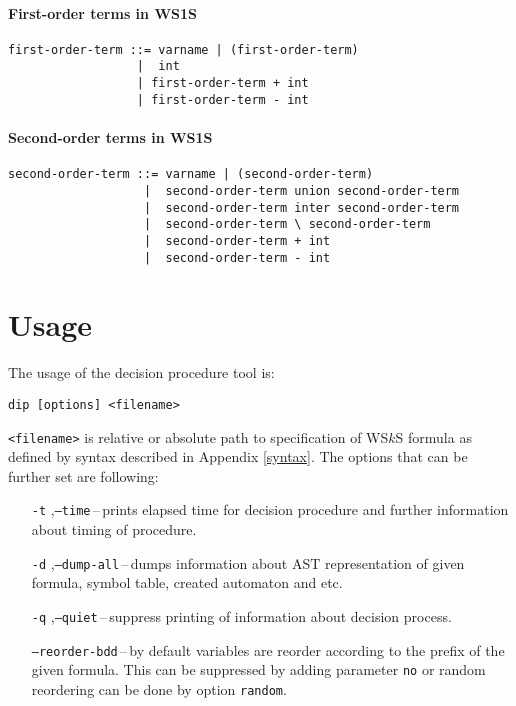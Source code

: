 \subsubsection{First-order terms in WS1S}
\begin{verbatim}
first-order-term ::= varname | (first-order-term)
                  |  int
                  | first-order-term + int
                  | first-order-term - int
\end{verbatim}

\subsubsection{Second-order terms in WS1S}
\begin{verbatim}
second-order-term ::= varname | (second-order-term)
                   |  second-order-term union second-order-term
                   |  second-order-term inter second-order-term
                   |  second-order-term \ second-order-term
                   |  second-order-term + int
                   |  second-order-term - int
\end{verbatim}

\chapter{Usage}
The usage of the decision procedure tool is:
\begin{center}
 \texttt{dip [options] <filename>}
\end{center}
\texttt{<filename>} is relative or absolute path to specification of WS$k$S
formula as defined by syntax described in Appendix \ref{syntax}. The options
that can be further set are following:
\begin{itemize}
  \item[\texttt{-t}],\texttt{--time}\,--\,prints elapsed time for decision
  procedure and further information about timing of procedure.
  \item[\texttt{-d}],\texttt{--dump-all}\,--\,dumps information about AST
  representation of given formula, symbol table, created automaton and etc.
  \item[\texttt{-q}],\texttt{--quiet}\,--\,suppress printing of information
  about decision process.
  \item[]\texttt{--reorder-bdd}\,--\,by default variables are reorder according
  to the prefix of the given formula. This can be suppressed by adding parameter
  \texttt{no} or random reordering can be done by option \texttt{random}.
\end{itemize}

